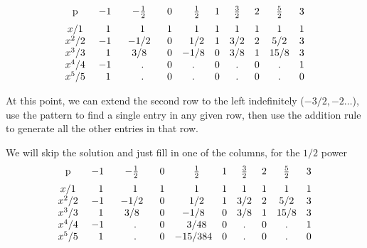\documentclass[11pt, oneside]{article}
\begin{document}
\[
\begin{matrix}
\text{p}  \vspace{2 mm} \\
x/1  \\
x^2/2 \\
x^3/3 \\
x^4/4 \\
x^5/5
\end{matrix} \ \ \ \
\begin{matrix}
-1 & -\frac{1}{2} & 0& \ \ \frac{1}{2} & 1& \frac{3}{2}  & 2 & \frac{5}{2}  & 3   \vspace{2 mm}  \\
\ \ 1 & \ \ 1 & 1 & \ \ 1 & 1 & 1 & 1 & 1 & 1 \\
-1 & \ \ -1/2 \ \ & 0 & \ \ 1/2 & 1 & 3/2 & 2 & 5/2 & 3 \\
\ \ 1 & 3/8 & 0 &  -1/8 & 0 & 3/8 & 1 & 15/8 & 3 \\
-1 &  \ \ .  & 0 & . & 0 & . & 0 & . & 1 \\
\ \ 1 &  \ \ . & 0 & . & 0 & . & 0 & . & 0 \\
\end{matrix}
\]

At this point, we can extend the second row to the left indefinitely ($-3/2, - 2 \dots$), use the pattern to find a single entry in any given row, then use the addition rule to generate all the other entries in that row.  

We will skip the solution and just fill in one of the columns, for the $1/2$ power
\[
\begin{matrix}
\text{p}  \vspace{2 mm} \\
x/1  \\
x^2/2 \\
x^3/3 \\
x^4/4 \\
x^5/5
\end{matrix} \ \ \ \
\begin{matrix}
-1 & -\frac{1}{2} & 0& \ \ \frac{1}{2} & 1& \frac{3}{2}  & 2 & \frac{5}{2}  & 3   \vspace{2 mm}  \\
\ \ 1 & \ \ 1 & 1 & \ \ 1 & 1 & 1 & 1 & 1 & 1 \\
-1 & \ \ -1/2 \ \ & 0 & \ \ 1/2 & 1 & 3/2 & 2 & 5/2 & 3 \\
\ \ 1 & 3/8 & 0 &  -1/8 & 0 & 3/8 & 1 & 15/8 & 3 \\
-1 &  \ \ .  & 0 & \ \ 3/48 & 0 & . & 0 & . & 1 \\
\ \ 1 &  \ \ . & 0 & -15/384 & 0 & . & 0 & . & 0 \\
\end{matrix}
\]
\end{document}
